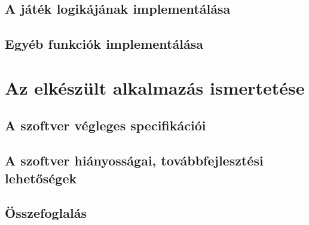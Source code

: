 \documentclass[12pt]{report}
\begin{document}
\section{A játék logikájának implementálása}
\section{Egyéb funkciók implementálása}

\chapter{Az elkészült alkalmazás ismertetése}
\section{A szoftver végleges specifikációi}
\section{A szoftver hiányosságai, továbbfejlesztési lehetőségek}
\section{Összefoglalás}
\end{document}
